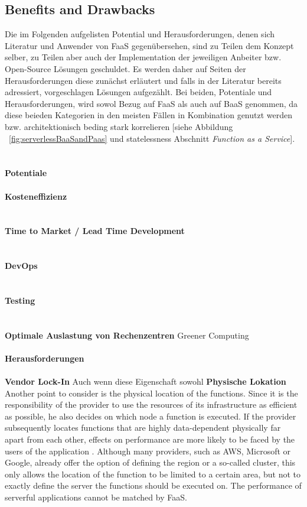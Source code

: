 \documentclass[11pt]{article}
\begin{document}
\subsection{Benefits and Drawbacks}
Die im Folgenden aufgelisten Potential und Herausforderungen, denen sich Literatur und Anwender von FaaS gegenübersehen, sind zu Teilen dem Konzept selber, zu Teilen aber auch der Implementation der jeweiligen Anbeiter bzw. Open-Source Lösungen geschuldet. Es werden daher auf Seiten der Herausforderungen diese zunächst erläutert und falls in der Literatur bereits adressiert, vorgeschlagen Lösungen aufgezählt. Bei beiden, Potentiale und Herausforderungen, wird sowol Bezug auf FaaS als auch auf BaaS genommen, da diese beieden Kategorien in den meisten Fällen in Kombination genutzt werden bzw. architektionisch beding stark korrelieren [siehe Abbildung ~\ref{fig:serverlessBaaSandPaas} und \glqq statelessness\grqq{} Abschnitt \textit{Function as a Service}].\\\\ \\
{\normalsize \textbf{Potentiale}}\\\\ 
\textbf{Kosteneffizienz}\\
\\\\ 
\textbf{Time to Market / Lead Time Development}\\
\\\\ 
\textbf{DevOps}\\
\\\\ 
\textbf{Testing}\\
\\\\ 
\textbf{Optimale Auslastung von Rechenzentren}
Greener Computing \cite{shafiei2020serverless} \cite{fowler2018serverless}
\\\\ 
{\normalsize \textbf{Herausforderungen}}\\\\ 
\textbf{Vendor Lock-In}
Auch wenn diese Eigenschaft sowohl 
\textbf{Physische Lokation}\\
Another point to consider is the physical location of the functions. Since it is the responsibility of the provider to use the resources of its infrastructure as efficient as possible, he also decides on which node a function is executed. If the provider subsequently locates functions that are highly data-dependent physically far apart from each other, effects on performance are more likely to be faced by the users of the application \cite{shafiei2020serverless}. Although many providers, such as AWS, Microsoft or Google, already offer the option of defining the region or a so-called cluster, this only allows the location of the function to be limited to a certain area, but not to exactly define the server the functions should be executed on. The performance of serverful applications cannot be matched by FaaS\cite{shafiei2020serverless}. \\\\ 
\end{document}
